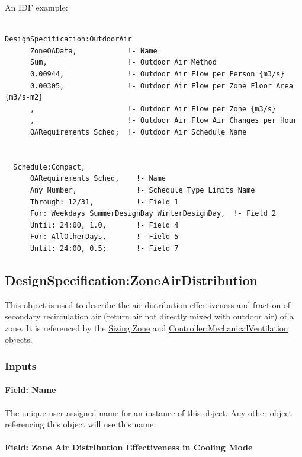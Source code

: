 An IDF example:

\begin{lstlisting}

DesignSpecification:OutdoorAir
      ZoneOAData,            !- Name
      Sum,                   !- Outdoor Air Method
      0.00944,               !- Outdoor Air Flow per Person {m3/s}
      0.00305,               !- Outdoor Air Flow per Zone Floor Area {m3/s-m2}
      ,                      !- Outdoor Air Flow per Zone {m3/s}
      ,                      !- Outdoor Air Flow Air Changes per Hour
      OARequirements Sched;  !- Outdoor Air Schedule Name


  Schedule:Compact,
      OARequirements Sched,    !- Name
      Any Number,              !- Schedule Type Limits Name
      Through: 12/31,          !- Field 1
      For: Weekdays SummerDesignDay WinterDesignDay,  !- Field 2
      Until: 24:00, 1.0,       !- Field 4
      For: AllOtherDays,       !- Field 5
      Until: 24:00, 0.5;       !- Field 7

\end{lstlisting}

\subsection{DesignSpecification:ZoneAirDistribution}\label{designspecificationzoneairdistribution}

This object is used to describe the air distribution effectiveness and fraction of secondary recirculation air (return air not directly mixed with outdoor air) of a zone. It is referenced by the \hyperref[sizingzone]{Sizing:Zone} and \hyperref[controllermechanicalventilation]{Controller:MechanicalVentilation} objects.

\subsubsection{Inputs}\label{inputs-1-011}

\paragraph{Field: Name}\label{field-name-1-010}

The unique user assigned name for an instance of this object. Any other object referencing this object will use this name.

\paragraph{Field: Zone Air Distribution Effectiveness in Cooling Mode}\label{field-zone-air-distribution-effectiveness-in-cooling-mode}

